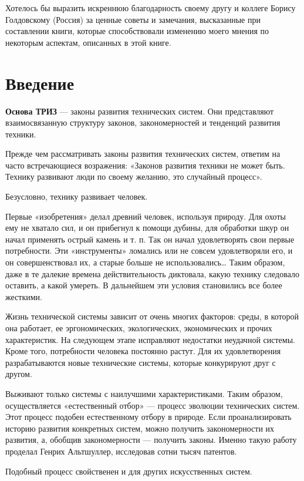 \documentclass[11pt,a4paper]{article}
\begin{document}
Хотелось бы выразить искреннюю благодарность своему другу и коллеге Борису
Голдовскому (Россия) за ценные советы и замечания, высказанные при составлении
книги, которые способствовали изменению моего мнения по некоторым аспектам,
описанных в этой книге.

\section*{Введение}

\textbf{Основа ТРИЗ} — законы развития технических систем. Они представляют
взаимосвязанную структуру законов, закономерностей и тенденций развития
техники.

Прежде чем рассматривать законы развития технических систем, ответим на часто
встречающиеся возражения: «Законов развития техники не может быть. Технику
развивают люди по своему желанию, это случайный процесс».

Безусловно, технику развивает человек.

Первые «изобретения» делал древний человек, используя природу. Для охоты ему
не хватало сил, и он прибегнул к помощи дубины, для обработки шкур он начал
применять острый камень и т. п. Так он начал удовлетворять свои первые
потребности. Эти «инструменты» ломались или не совсем удовлетворяли его, и он
совершенствовал их, а старые больше не использовались… Таким образом, даже в
те далекие времена действительность диктовала, какую технику следовало
оставить, а какой умереть. В дальнейшем эти условия становились все более
жесткими.

Жизнь технической системы зависит от очень многих факторов: среды, в которой
она работает, ее эргономических, экологических, экономических и прочих
характеристик.  На следующем этапе исправляют недостатки неудачной системы.
Кроме того, потребности человека постоянно растут. Для их удовлетворения
разрабатываются новые технические системы, которые конкурируют друг с другом.

Выживают только системы с наилучшими характеристиками. Таким образом,
осуществляется «естественный отбор» — процесс эволюции технических систем.
Этот процесс подобен естественному отбору в природе. Если проанализировать
историю развития конкретных систем, можно получить закономерности их развития,
а, обобщив закономерности — получить законы. Именно такую работу проделал
Генрих Альтшуллер, исследовав сотни тысяч патентов.

Подобный процесс свойственен и для других искусственных систем.
\end{document}
